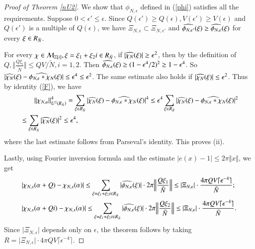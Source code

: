 \documentclass[12pt,amstex]{amsart}
\theoremstyle{definition}
\def \Z {\mathbb{Z}[i]}
\def \A {\alpha}
\def \e {\epsilon}
\def \R {R_{\tilde{N}}}
\def \x {\bold{\xi}}
\begin{document}
\begin{proof}[Proof of Theorem \ref{nU2}]
  We show that $\phi_{N,\e}$ defined in (\ref{phi}) satisfies all the requirements. Suppose $0<\e'\leq\e$. Since $Q(\e')\geq Q(\e), V(\e')\geq V(\e)$ and $Q(\e')$ is a multiple of $Q(\e)$, we have $\Xi_{N,\e}\subset\Xi_{N,\e'}$ and $\widehat{\phi_{N,\e'}}(\x)\geq\widehat{\phi_{N,\e}}(\x)$ for every $\x\in \R$.

  For every $\chi\in\mathcal{M}_{\Z},\x=\xi_{1}+\xi_{2}i\in \R$, if $\vert\widehat{\chi_{N}}(\x)\vert\geq\e^{2}$, then by the definition of $Q, \Vert\frac{Q\xi_{i}}{\tilde{N}}\Vert\leq QV/\tilde{N}, i=1,2$. Then $\widehat{\phi_{N,\e}}(\x)\geq(1-\e^{4}/2)^{2}\geq 1-\e^{4}$. So
  $\vert\widehat{\chi_{N}}(\x)-\widehat{\phi_{N,\e}*\chi_{N}}(\x)\vert\leq\e^{4}\leq\e^{2}$. The same estimate also holds if $\vert\widehat{\chi_{N}}(\x)\vert\leq\e^{2}$. Thus by identity (\ref{F}), we have
    \begin{equation}\nonumber
  \begin{split}
  &\qquad \Vert\chi_{N,u}\Vert_{U^{2}(\R)}^{4}=\sum_{\x\in \R}\vert\widehat{\chi_{N}}(\x)-\widehat{\phi_{N,\e}*\chi_{N}}(\x)\vert^{4}\leq\e^{4}\sum_{\x\in \R}\vert\widehat{\chi_{N}}(\x)-\widehat{\phi_{N,\e}*\chi_{N}}(\x)\vert^{2}
  \\&\leq\sum_{\x\in \R}\vert\widehat{\chi_{N}}(\x)\vert^{2}\leq\e^{4},
  \end{split}
\end{equation}
where the last estimate follows from Parseval's identity. This proves (ii).

Lastly, using Fourier inversion formula and the estimate $\vert e(x)-1\vert\leq 2\pi\Vert x\Vert$, we get
    \begin{equation}\nonumber
  \begin{split}
  &\vert\chi_{N,s}(\A+Q)-\chi_{N,s}(\A)\vert\leq\sum_{\x=\xi_{1}+\xi_{2}i\in \R}\vert\widehat{\phi_{N,\e}}(\x)\vert\cdot 2\pi\Bigl\Vert\frac{Q\xi_{1}}{\tilde{N}}\Bigr\Vert
  \leq\vert\Xi_{N,\e}\vert\cdot\frac{4\pi QV\lceil\e^{-4}\rceil}{\tilde{N}};
  \\& \vert\chi_{N,s}(\A+Qi)-\chi_{N,s}(\A)\vert\leq\sum_{\x=\xi_{1}+\xi_{2}i\in \R}\vert\widehat{\phi_{N,\e}}(\x)\vert\cdot 2\pi\Bigl\Vert\frac{Q\xi_{2}}{\tilde{N}}\Bigr\Vert
  \leq\vert\Xi_{N,\e}\vert\cdot\frac{ 4\pi QV\lceil\e^{-4}\rceil}{\tilde{N}}.
  \end{split}
\end{equation}
Since $\vert\Xi_{N,\e}\vert$ depends only on $\e$, the theorem follows by taking $R=\vert\Xi_{N,\e}\vert\cdot 4\pi QV\lceil\e^{-4}\rceil$.
\end{proof}
\end{document}
